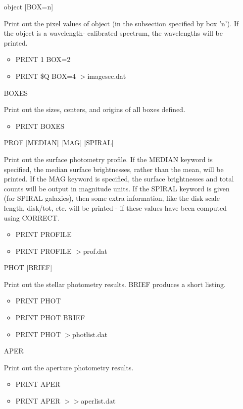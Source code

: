 \begin{itemize}
  \item[object {[BOX=n]}\hfill]{ Print out the pixel values of object (in
       the subsection specified by box 'n').  If the object is a
       wavelength- calibrated spectrum, the wavelengths will be printed.
  \begin{itemize}
    \item{PRINT 1 BOX=2}
    \item{PRINT \$Q BOX=4 $>$imagesec.dat}
  \end{itemize}
}

  \item[BOXES\hfill]{Print out the sizes, centers, and origins of all boxes
       defined.
  \begin{itemize}
    \item{PRINT BOXES}
  \end{itemize}
}

  \item[PROF {[MEDIAN]} {[MAG]} {[SPIRAL]}\hfill]{ Print out the surface
       photometry profile.  If the MEDIAN keyword is specified, the median
       surface brightnesses, rather than the mean, will be printed. If the
       MAG keyword is specified, the surface brightnesses and total counts
       will be output in magnitude units. If the SPIRAL keyword is given
       (for SPIRAL galaxies), then some extra information, like the disk
       scale length, disk/tot, etc. will be printed - if these values have
       been computed using CORRECT.
  \begin{itemize}
    \item{PRINT PROFILE}
    \item{PRINT PROFILE $>$prof.dat}
  \end{itemize}
}

  \item[PHOT {[BRIEF]}\hfill]{ Print out the stellar photometry results.
       BRIEF produces a short listing.
  \begin{itemize}
    \item{PRINT PHOT }
    \item{PRINT PHOT BRIEF}
    \item{PRINT PHOT $>$photlist.dat}
  \end{itemize}
}

  \item[APER\hfill]{ Print out the aperture photometry results.
  \begin{itemize}
    \item{PRINT APER}
    \item{PRINT APER $>>$aperlist.dat}
  \end{itemize}
}


\end{itemize}
